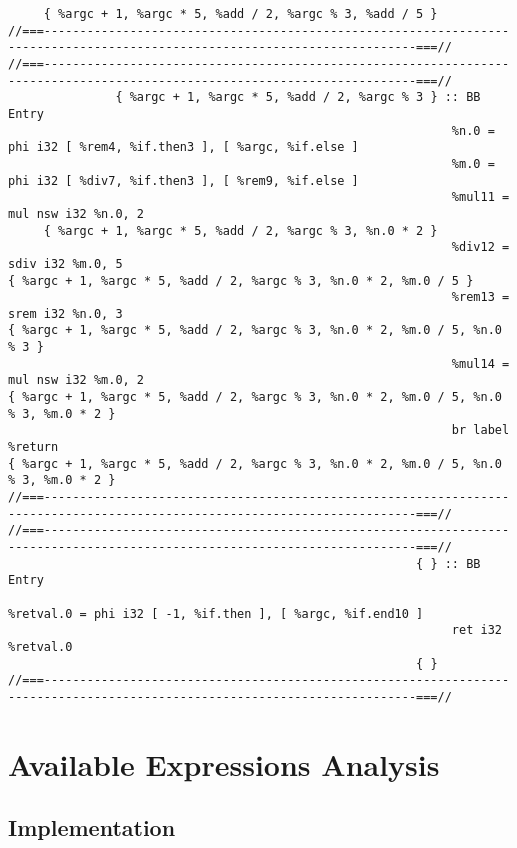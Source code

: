 \begin{verbatim}
     { %argc + 1, %argc * 5, %add / 2, %argc % 3, %add / 5 }
//===--------------------------------------------------------------------------------------------------------------------------===//
//===--------------------------------------------------------------------------------------------------------------------------===//
               { %argc + 1, %argc * 5, %add / 2, %argc % 3 } :: BB Entry
                                                              %n.0 = phi i32 [ %rem4, %if.then3 ], [ %argc, %if.else ]
                                                              %m.0 = phi i32 [ %div7, %if.then3 ], [ %rem9, %if.else ]
                                                              %mul11 = mul nsw i32 %n.0, 2
     { %argc + 1, %argc * 5, %add / 2, %argc % 3, %n.0 * 2 }
                                                              %div12 = sdiv i32 %m.0, 5
{ %argc + 1, %argc * 5, %add / 2, %argc % 3, %n.0 * 2, %m.0 / 5 }
                                                              %rem13 = srem i32 %n.0, 3
{ %argc + 1, %argc * 5, %add / 2, %argc % 3, %n.0 * 2, %m.0 / 5, %n.0 % 3 }
                                                              %mul14 = mul nsw i32 %m.0, 2
{ %argc + 1, %argc * 5, %add / 2, %argc % 3, %n.0 * 2, %m.0 / 5, %n.0 % 3, %m.0 * 2 }
                                                              br label %return
{ %argc + 1, %argc * 5, %add / 2, %argc % 3, %n.0 * 2, %m.0 / 5, %n.0 % 3, %m.0 * 2 }
//===--------------------------------------------------------------------------------------------------------------------------===//
//===--------------------------------------------------------------------------------------------------------------------------===//
                                                         { } :: BB Entry
                                                              %retval.0 = phi i32 [ -1, %if.then ], [ %argc, %if.end10 ]
                                                              ret i32 %retval.0
                                                         { }
//===--------------------------------------------------------------------------------------------------------------------------===//
\end{verbatim}
\endgroup

\section{Available Expressions Analysis}

\subsection{Implementation}

